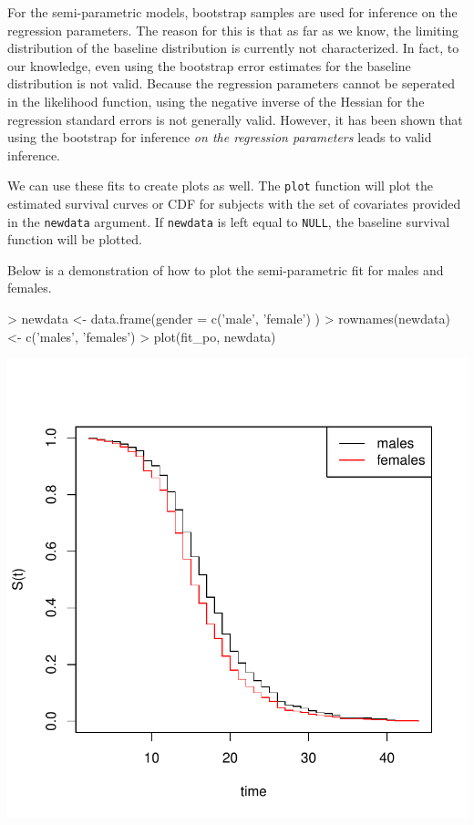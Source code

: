 \documentclass[a4paper]{article}
\begin{document}
For the semi-parametric models, bootstrap samples are used for inference on the regression parameters. The reason for this is that as far as we know, the limiting distribution of the baseline distribution is currently not characterized. In fact, to our knowledge, even using the bootstrap error estimates for the baseline distribution is not valid. Because the regression parameters cannot be seperated in the likelihood function, using the negative inverse of the Hessian for the regression standard errors is not generally valid. However, it has been shown that using the bootstrap for inference \emph{on the regression parameters} leads to valid inference. 

We can use these fits to create plots as well. The \texttt{plot} function will plot the estimated survival curves or CDF for subjects with the set of covariates provided in the \texttt{newdata} argument. If \texttt{newdata} is left equal to \texttt{NULL}, the baseline survival function will be plotted. 
  
Below is a demonstration of how to plot the semi-parametric fit for males and females.
  
\begin{Schunk}
\begin{Sinput}
>   newdata <- data.frame(gender = c('male', 'female') )
>   rownames(newdata) <- c('males', 'females')
>   plot(fit_po, newdata)
\end{Sinput}
\end{Schunk}
\includegraphics{icenReg-010}
\end{document}
